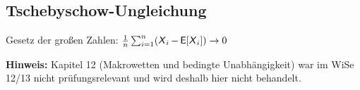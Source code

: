 \documentclass[german,color,6pt]{latex4ei/latex4ei_sheet}
\begin{document}
\begin{sectionbox}
	\subsection{Tschebyschow-Ungleichung}
	
	Gesetz der großen Zahlen: $\frac{1}{n} \sum_{i = 1}^n (\operatorname{\textsf{\textit{X}}}_i - \operatorname{\textsf{E}}[\operatorname{\textsf{\textit{X}}}_i]) \rightarrow 0$
\end{sectionbox}




\setcounter{section}{12}    
\textbf{Hinweis:} Kapitel 12 (Makrowetten und bedingte Unabhängigkeit) war im WiSe 12/13 nicht prüfungsrelevant und wird deshalb hier nicht behandelt.

\vfill

\end{document}
